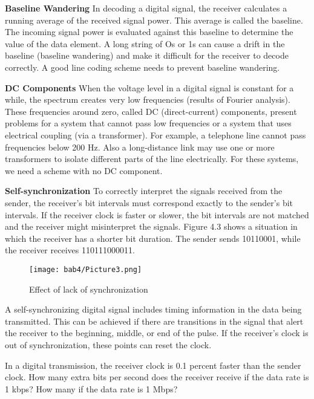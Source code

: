 \textbf{Baseline Wandering} In decoding a digital signal, the receiver calculates a running average of the received signal power. This average is called the baseline. The incoming signal power is evaluated against this baseline to determine the value of the data element. A long string of Os or 1s can cause a drift in the baseline (baseline wandering) and make it difficult for the receiver to decode correctly. A good line coding scheme needs to prevent baseline wandering.

\textbf{DC Components} When the voltage level in a digital signal is constant for a while, the spectrum creates very low frequencies (results of Fourier analysis). These frequencies around zero, called DC (direct-current) components, present problems for a system that cannot pass low frequencies or a system that uses electrical coupling (via a transformer). For example, a telephone line cannot pass frequencies below 200 Hz. Also a long-distance link may use one or more transformers to isolate different parts of the line electrically. For these systems, we need a scheme with no DC component.

\textbf{Self-synchronization} To correctly interpret the signals received from the sender, the receiver's bit intervals must correspond exactly to the sender's bit intervals. If the receiver clock is faster or slower, the bit intervals are not matched and the receiver might misinterpret the signals. Figure 4.3 shows a situation in which the receiver has a shorter bit duration. The sender sends 10110001, while the receiver receives 110111000011.

\begin{figure}
  \centering
  \texttt{[image: bab4/Picture3.png]}
  \caption{Effect of lack of synchronization}
  \label{fig4:3}
\end{figure}

A self-synchronizing digital signal includes timing information in the data being transmitted. This can be achieved if there are transitions in the signal that alert the receiver to the beginning, middle, or end of the pulse. If the receiver's clock is out of synchronization, these points can reset the clock.

\vspace{12pt}

\begin{example}
  In a digital transmission, the receiver clock is 0.1 percent faster than the sender clock. How many extra bits per second does the receiver receive if the data rate is 1 kbps? How many if the data rate is 1 Mbps?
\end{example}

